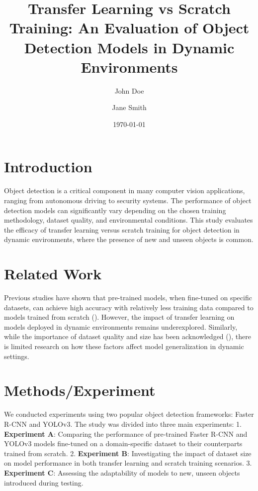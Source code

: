 \documentclass{article}
\title{Transfer Learning vs Scratch Training: An Evaluation of Object Detection Models in Dynamic Environments}
\author{John Doe \and Jane Smith}
\date{\today}
\begin{document}
\maketitle

\section{Introduction}
Object detection is a critical component in many computer vision applications, ranging from autonomous driving to security systems. The performance of object detection models can significantly vary depending on the chosen training methodology, dataset quality, and environmental conditions. This study evaluates the efficacy of transfer learning versus scratch training for object detection in dynamic environments, where the presence of new and unseen objects is common.

\section{Related Work}
Previous studies have shown that pre-trained models, when fine-tuned on specific datasets, can achieve high accuracy with relatively less training data compared to models trained from scratch (\cite{Krizhevsky2012}). However, the impact of transfer learning on models deployed in dynamic environments remains underexplored. Similarly, while the importance of dataset quality and size has been acknowledged (\cite{Russakovsky2015}), there is limited research on how these factors affect model generalization in dynamic settings.

\section{Methods/Experiment}
We conducted experiments using two popular object detection frameworks: Faster R-CNN and YOLOv3. The study was divided into three main experiments:
1. \textbf{Experiment A}: Comparing the performance of pre-trained Faster R-CNN and YOLOv3 models fine-tuned on a domain-specific dataset to their counterparts trained from scratch.
2. \textbf{Experiment B}: Investigating the impact of dataset size on model performance in both transfer learning and scratch training scenarios.
3. \textbf{Experiment C}: Assessing the adaptability of models to new, unseen objects introduced during testing.
\end{document}
